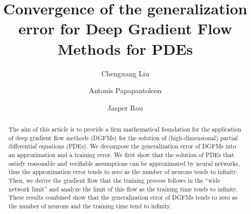 \documentclass[11pt,a4paper,reqno]{amsart}
\numberwithin{equation}{section}
\theoremstyle{plain}
\theoremstyle{definition}
\begin{document}
\title[Convergence of Deep Gradient Flow Methods for PDE]{Convergence of the generalization error for Deep Gradient Flow Methods for PDE\MakeLowercase{s}}

\author[C. Liu]{Chenguang Liu}
\author[A. Papapantoleon]{Antonis Papapantoleon}
\author[J. Rou]{Jasper Rou}

\address{Delft Institute of Applied Mathematics, EEMCS, TU Delft, 2628 Delft, The Netherlands.}

\address{Delft Institute of Applied Mathematics, EEMCS, TU Delft, 2628 Delft, The Netherlands \& Institute of Applied and Computational Mathematics, FORTH, 70013 Heraklion, Greece}

\address{Delft Institute of Applied Mathematics, EEMCS, TU Delft, 2628 Delft, The Netherlands}



\begin{abstract}
The aim of this article is to provide a firm mathematical foundation for the application of deep gradient flow methods (DGFMs) for the solution of (high-dimensional) partial differential equations (PDEs).
We decompose the generalization error of DGFMs into an approximation and a training error. 
We first show that the solution of PDEs that satisfy reasonable and verifiable assumptions can be approximated by neural networks, thus the approximation error tends to zero as the number of neurons tends to infinity.
Then, we derive the gradient flow that the training process follows in the ``wide network limit'' and analyze the limit of this flow as the training time tends to infinity. These results combined show that the generalization error of DGFMs tends to zero as the number of neurons and the training time tend to infinity.
\end{abstract}

\maketitle

\end{document}
